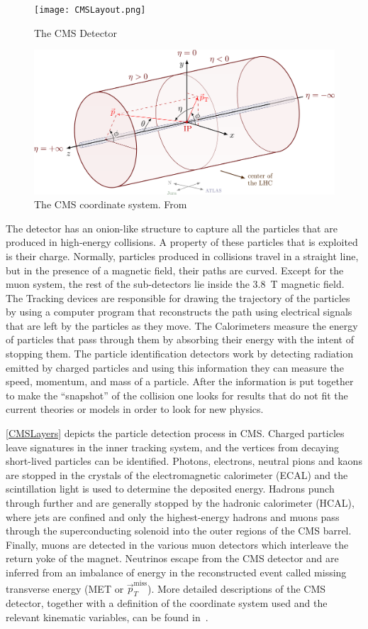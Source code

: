 \begin{figure}
	\centering
	\texttt{[image: CMSLayout.png]}
	\caption[CMS Detector]{The CMS Detector \cite{CMS_detector}}
	\label{CMSLayout}
\end{figure}
\begin{figure}
	\centering
	\includegraphics[width=.8\linewidth]{Images/CMS Coordinate.png}
	\caption[The CMS coordinate system]{The CMS coordinate system. From \cite{CMS_detector}}
	\label{fig:CMSCoord}
\end{figure}
The detector has an onion-like structure to capture all the particles that are produced in high-energy collisions.
A property of these particles that is exploited is their charge. Normally, particles produced in collisions travel in a straight line, but in the presence of a magnetic field, their paths are curved.
Except for the muon system, the rest of the sub-detectors lie inside the 3.8~\unit{T} magnetic field.
The Tracking devices are responsible for drawing the trajectory of the particles by using a computer program that reconstructs the path using electrical signals that are left by the particles as they move. The Calorimeters measure the energy of particles that pass through them by absorbing their energy with the intent of stopping them.
The particle identification detectors work by detecting radiation emitted by charged particles and using this information they can measure the speed, momentum, and mass of a particle. After the information is put together to make the “snapshot” of the collision one looks for results that do not fit the current theories or models in order to look for new physics.

\autoref{CMSLayers} depicts the particle detection process in CMS. Charged particles leave signatures in the inner tracking system, and the vertices from decaying short-lived particles can be identified. Photons, electrons, neutral pions and kaons are stopped in the crystals of the electromagnetic calorimeter (ECAL) and the scintillation light is used to determine the deposited energy. Hadrons punch through further and are generally stopped by the hadronic calorimeter (HCAL), where jets are confined and only the highest-energy hadrons and muons pass through the superconducting solenoid into the outer regions of the CMS barrel. Finally, muons are detected in the various muon detectors which interleave the return yoke of the magnet. Neutrinos escape from the CMS detector and are inferred from an imbalance of energy in the reconstructed event called missing transverse energy (MET or $\vec{p}_T^{\text{miss}}$).
More detailed descriptions of the CMS detector, together with a definition of the coordinate system used and the relevant kinematic variables, can be found in~\cite{CMS:2008xjf,CMS:2023gfb}.

